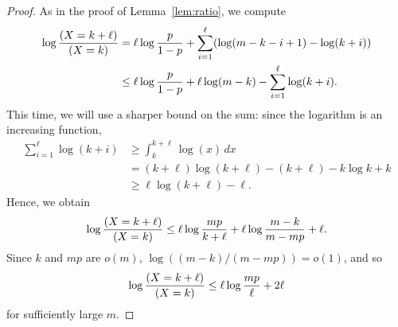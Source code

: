 \documentclass[EJP,final]{ejpecp}
\newcommand{\1}[1]{\mathbbm{1}_{\{#1\}}}
\let\Pr\relax
\DeclareMathOperator{\Pr}{Pr}
\begin{document}
\begin{proof}
 As in the proof of Lemma~\ref{lem:ratio}, we compute
 \begin{align*}
  \log \frac {\Pr(X = k + \ell)}{\Pr(X = k)}
  &= \ell \log \frac{p}{1-p} + \sum_{i=1}^\ell (\log(m-k-i+1) - \log(k+i)) \\
  &\le \ell \log \frac{p}{1-p} + \ell \log(m-k) - \sum_{i=1}^\ell \log(k+i).
 \end{align*}
 This time, we will use a sharper bound on the sum:
 since the logarithm is an increasing function,
 \begin{align*}
  \sum_{i=1}^\ell \log(k+i)
  &\ge \int_k^{k+\ell} \log(x) \, dx \\
  &= (k+\ell) \log(k+\ell) - (k+\ell) - k \log k + k \\
  &\ge \ell \log(k+\ell) - \ell.
 \end{align*}
 Hence, we obtain
 \[
  \log \frac {\Pr(X = k + \ell)}{\Pr(X = k)}
  \le \ell \log \frac{mp}{k+\ell} + \ell \log\frac{m-k}{m-mp} + \ell.
 \]
 Since $k$ and $mp$ are $o(m)$, $\log((m-k)/(m-mp)) = o(1)$,
 and so
 \[
  \log \frac {\Pr(X = k + \ell)}{\Pr(X = k)}
  \le \ell \log \frac{mp}{\ell} + 2\ell
 \]
 for sufficiently large $m$.
\end{proof}
\end{document}
